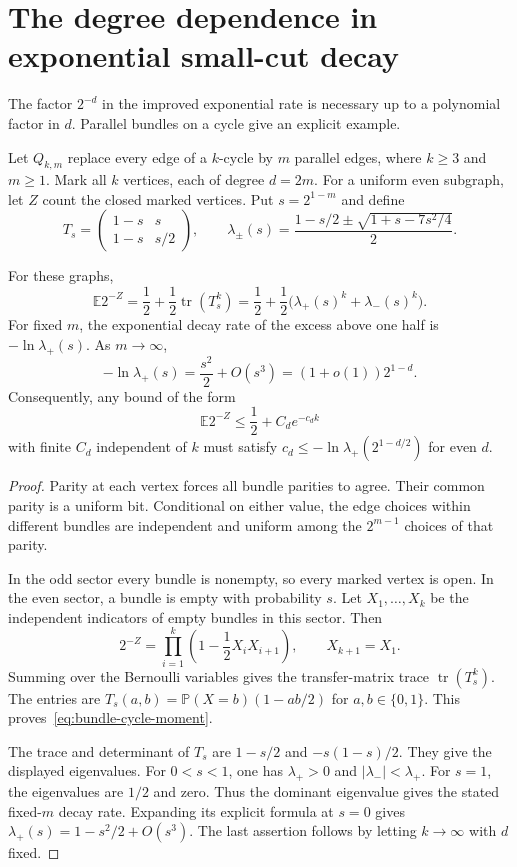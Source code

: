 \section{The degree dependence in exponential small-cut decay}
\label{sec:cut-rate-obstruction}

The factor $2^{-d}$ in the improved exponential rate is necessary up to a polynomial factor in $d$.
Parallel bundles on a cycle give an explicit example.

Let $Q_{k,m}$ replace every edge of a $k$-cycle by $m$ parallel edges, where $k\ge3$ and $m\ge1$.
Mark all $k$ vertices, each of degree $d=2m$.
For a uniform even subgraph, let $Z$ count the closed marked vertices.
Put $s=2^{1-m}$ and define
\[
 T_s=\begin{pmatrix}1-s&s\\1-s&s/2\end{pmatrix},
 \qquad
 \lambda_\pm(s)=\frac{1-s/2\pm\sqrt{1+s-7s^2/4}}2.
\]

\begin{proposition}\label{prop:cut-rate-obstruction}
For these graphs,
\begin{equation}\label{eq:bundle-cycle-moment}
 \mathbb E2^{-Z}
 =\frac12+\frac12\operatorname{tr}(T_s^k)
 =\frac12+\frac12\bigl(\lambda_+(s)^k+\lambda_-(s)^k\bigr).
\end{equation}
For fixed $m$, the exponential decay rate of the excess above one half is $-\ln\lambda_+(s)$.
As $m\to\infty$,
\[
 -\ln\lambda_+(s)=\frac{s^2}{2}+O(s^3)
 =(1+o(1))2^{1-d}.
\]
Consequently, any bound of the form
\[
 \mathbb E2^{-Z}\le\frac12+C_d e^{-c_d k}
\]
with finite $C_d$ independent of $k$ must satisfy $c_d\le-\ln\lambda_+(2^{1-d/2})$ for even $d$.
\end{proposition}

\begin{proof}
Parity at each vertex forces all bundle parities to agree.
Their common parity is a uniform bit.
Conditional on either value, the edge choices within different bundles are independent and uniform among the $2^{m-1}$ choices of that parity.

In the odd sector every bundle is nonempty, so every marked vertex is open.
In the even sector, a bundle is empty with probability $s$.
Let $X_1,\ldots,X_k$ be the independent indicators of empty bundles in this sector.
Then
\[
 2^{-Z}=\prod_{i=1}^k\left(1-\frac12X_iX_{i+1}\right),
 \qquad X_{k+1}=X_1.
\]
Summing over the Bernoulli variables gives the transfer-matrix trace $\operatorname{tr}(T_s^k)$.
The entries are $T_s(a,b)=\mathbb P(X=b)(1-ab/2)$ for $a,b\in\{0,1\}$.
This proves~\eqref{eq:bundle-cycle-moment}.

The trace and determinant of $T_s$ are $1-s/2$ and $-s(1-s)/2$.
They give the displayed eigenvalues.
For $0<s<1$, one has $\lambda_+>0$ and $|\lambda_-|<\lambda_+$.
For $s=1$, the eigenvalues are $1/2$ and zero.
Thus the dominant eigenvalue gives the stated fixed-$m$ decay rate.
Expanding its explicit formula at $s=0$ gives $\lambda_+(s)=1-s^2/2+O(s^3)$.
The last assertion follows by letting $k\to\infty$ with $d$ fixed.
\end{proof}

